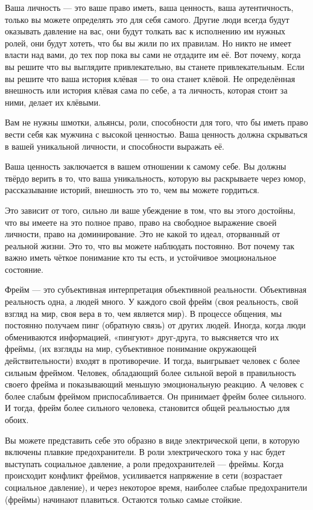 Ваша личность --- это ваше право иметь, ваша ценность, ваша аутентичность, только вы можете определять это для себя самого. Другие люди всегда будут оказывать давление на вас, они будут толкать вас к исполнению им нужных ролей, они будут хотеть, что бы вы жили по их правилам. Но никто не имеет власти над вами, до тех пор пока вы сами не отдадите им её. Вот почему, когда вы решите что вы выглядите привлекательно, вы станете привлекательным. Если вы решите что ваша история клёвая --- то она станет клёвой. Не определённая внешность или история клёвая сама по себе, а та личность, которая стоит за ними, делает их клёвыми.

\RULE  Вам не нужны шмотки, альянсы, роли, способности для того, что бы иметь право вести себя как мужчина с высокой ценностью. Ваша ценность должна скрываться в вашей уникальной личности, и способности выражать её.

Ваша ценность заключается в вашем отношении к самому себе. Вы должны твёрдо верить в то, что ваша уникальность, которую вы раскрываете через юмор, рассказывание историй, внешность это то, чем вы можете гордиться.

Это зависит от того, сильно ли ваше убеждение в том, что вы этого достойны, что вы имеете на это полное право, право на свободное выражение своей личности, право на доминирование. Это не какой то идеал, оторванный от реальной жизни. Это то, что вы можете наблюдать постоянно. Вот почему так важно иметь чёткое понимание кто ты есть, и устойчивое эмоциональное состояние.

Фрейм --- это субъективная интерпретация объективной реальности. Объективная реальность одна, а людей много. У каждого свой фрейм (своя реальность, свой взгляд на мир, своя вера в то, чем является мир). В процессе общения, мы постоянно получаем пинг (обратную связь) от других людей. Иногда, когда люди обмениваются информацией, «пингуют» друг-друга, то выясняется что их фреймы, (их взгляды на мир, субъективное понимание окружающей действительности) входят в противоречие. И тогда, выигрывает человек с более сильным фреймом. Человек, обладающий более сильной верой в правильность своего фрейма и показывающий меньшую эмоциональную реакцию. А человек с более слабым фреймом приспосабливается. Он принимает фрейм более сильного. И тогда, фрейм более сильного человека, становится общей реальностью для обоих.

Вы можете представить себе это образно в виде электрической цепи, в которую включены плавкие предохранители. В роли электрического тока у нас будет выступать социальное давление, а роли предохранителей --- фреймы. Когда происходит конфликт фреймов, усиливается напряжение в сети (возрастает социальное давление), и через некоторое время, наиболее слабые предохранители (фреймы) начинают плавиться. Остаются только самые стойкие.

